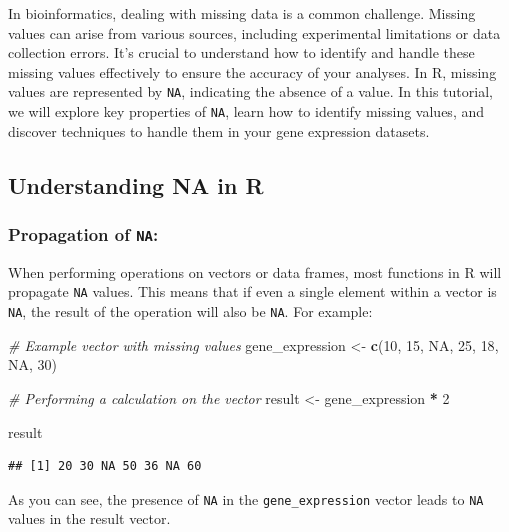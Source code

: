 \documentclass[
]{book}
\newenvironment{Shaded}{\begin{snugshade}}{\end{snugshade}}
\newcommand{\CommentTok}[1]{\textcolor[rgb]{0.56,0.35,0.01}{\textit{#1}}}
\newcommand{\ConstantTok}[1]{\textcolor[rgb]{0.56,0.35,0.01}{#1}}
\newcommand{\DecValTok}[1]{\textcolor[rgb]{0.00,0.00,0.81}{#1}}
\newcommand{\FunctionTok}[1]{\textcolor[rgb]{0.13,0.29,0.53}{\textbf{#1}}}
\newcommand{\NormalTok}[1]{#1}
\newcommand{\OtherTok}[1]{\textcolor[rgb]{0.56,0.35,0.01}{#1}}
\newcommand{\SpecialCharTok}[1]{\textcolor[rgb]{0.81,0.36,0.00}{\textbf{#1}}}
\begin{document}
In bioinformatics, dealing with missing data is a common challenge. Missing values can arise from various sources, including experimental limitations or data collection errors. It's crucial to understand how to identify and handle these missing values effectively to ensure the accuracy of your analyses. In R, missing values are represented by \texttt{NA}, indicating the absence of a value. In this tutorial, we will explore key properties of \texttt{NA}, learn how to identify missing values, and discover techniques to handle them in your gene expression datasets.

\hypertarget{understanding-na-in-r}{%
\subsection{Understanding NA in R}\label{understanding-na-in-r}}

\hypertarget{propagation-of-na}{%
\subsubsection{\texorpdfstring{Propagation of \texttt{NA}:}{Propagation of NA:}}\label{propagation-of-na}}

When performing operations on vectors or data frames, most functions in R will propagate \texttt{NA} values. This means that if even a single element within a vector is \texttt{NA}, the result of the operation will also be \texttt{NA}. For example:

\begin{Shaded}
\begin{Highlighting}[]
\CommentTok{\# Example vector with missing values}
\NormalTok{gene\_expression }\OtherTok{\textless{}{-}} \FunctionTok{c}\NormalTok{(}\DecValTok{10}\NormalTok{, }\DecValTok{15}\NormalTok{, }\ConstantTok{NA}\NormalTok{, }\DecValTok{25}\NormalTok{, }\DecValTok{18}\NormalTok{, }\ConstantTok{NA}\NormalTok{, }\DecValTok{30}\NormalTok{)}

\CommentTok{\# Performing a calculation on the vector}
\NormalTok{result }\OtherTok{\textless{}{-}}\NormalTok{ gene\_expression }\SpecialCharTok{*} \DecValTok{2}

\NormalTok{result}
\end{Highlighting}
\end{Shaded}

\begin{verbatim}
## [1] 20 30 NA 50 36 NA 60
\end{verbatim}

As you can see, the presence of \texttt{NA} in the \texttt{gene\_expression} vector leads to \texttt{NA} values in the result vector.
\end{document}
